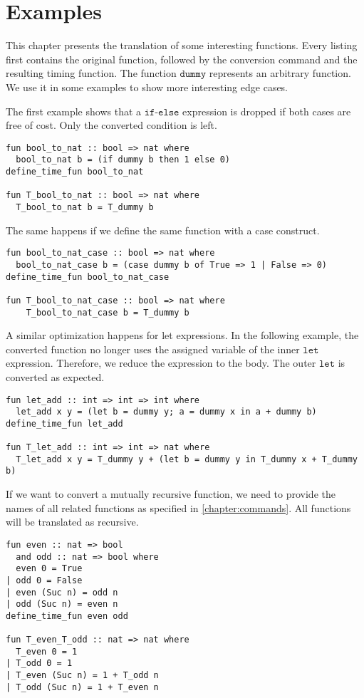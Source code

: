 
\section{Examples}
This chapter presents the translation of some interesting functions.
Every listing first contains the original function, followed by the conversion command and the resulting timing function.
The function $\texttt{dummy}$ represents an arbitrary function.
We use it in some examples to show more interesting edge cases.

The first example shows that a $\texttt{if-else}$ expression is dropped if both cases are free of cost.
Only the converted condition is left.
\begin{lstlisting}[language=isabelle,mathescape=true]
fun bool_to_nat :: bool => nat where
  bool_to_nat b = (if dummy b then 1 else 0)
define_time_fun bool_to_nat

fun T_bool_to_nat :: bool => nat where
  T_bool_to_nat b = T_dummy b
\end{lstlisting}

The same happens if we define the same function with a case construct.
\begin{lstlisting}[language=isabelle,mathescape=true]
fun bool_to_nat_case :: bool => nat where
  bool_to_nat_case b = (case dummy b of True => 1 | False => 0)
define_time_fun bool_to_nat_case

fun T_bool_to_nat_case :: bool => nat where
    T_bool_to_nat_case b = T_dummy b
\end{lstlisting}

A similar optimization happens for let expressions.
In the following example, the converted function no longer uses the assigned variable of the inner $\texttt{let}$ expression.
Therefore, we reduce the expression to the body.
The outer $\texttt{let}$ is converted as expected.
\begin{lstlisting}[language=isabelle,mathescape=true]
fun let_add :: int => int => int where
  let_add x y = (let b = dummy y; a = dummy x in a + dummy b)
define_time_fun let_add

fun T_let_add :: int => int => nat where
  T_let_add x y = T_dummy y + (let b = dummy y in T_dummy x + T_dummy b)
\end{lstlisting}

If we want to convert a mutually recursive function, we need to provide the names of all related functions as specified in \autoref{chapter:commands}.
All functions will be translated as recursive.
\begin{lstlisting}[language=isabelle,mathescape=true]
fun even :: nat => bool
  and odd :: nat => bool where
  even 0 = True
| odd 0 = False
| even (Suc n) = odd n
| odd (Suc n) = even n
define_time_fun even odd

fun T_even_T_odd :: nat => nat where
  T_even 0 = 1
| T_odd 0 = 1
| T_even (Suc n) = 1 + T_odd n
| T_odd (Suc n) = 1 + T_even n
\end{lstlisting}

